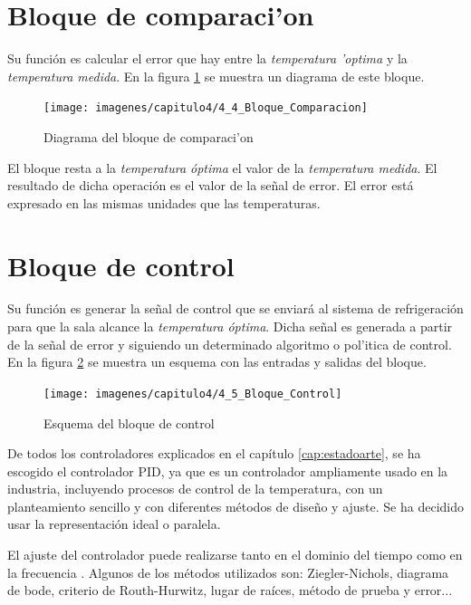 \section{Bloque de comparaci'on}\label{sec:comparacion}

Su función es calcular el error que hay entre la \textit{temperatura 'optima} y la \textit{temperatura medida}. En la figura \ref{4_4:diag_comparacion} se muestra un diagrama de este bloque. 

\begin{figure}[htbp]
  \centering
  \texttt{[image: imagenes/capitulo4/4\_4\_Bloque\_Comparacion]}
   \caption{Diagrama del bloque de comparaci'on}
   \label{4_4:diag_comparacion}
\end{figure}

	El bloque resta a la \textit{temperatura óptima} el valor de la \textit{temperatura medida}. El resultado de dicha operación es el valor de la señal de error. El error está expresado en las mismas unidades que las temperaturas.

\section{Bloque de control}\label{sec:control}

	Su función es generar la señal de control que se enviará al sistema de refrigeración para que la sala alcance la \textit{temperatura óptima}. Dicha señal es generada a partir de la señal de error y siguiendo un determinado algoritmo o pol'itica de control. En la figura \ref{4_5:diag_control} se muestra un esquema con las entradas y salidas del bloque.

\begin{figure}[htbp]
  \centering
  \texttt{[image: imagenes/capitulo4/4\_5\_Bloque\_Control]}
   \caption{Esquema del bloque de control}
   \label{4_5:diag_control}
\end{figure}

	De todos los controladores explicados en el capítulo \ref{cap:estadoarte}, se ha escogido el controlador PID, ya que es un controlador ampliamente usado en la industria, incluyendo procesos de control de la temperatura, con un planteamiento sencillo y con diferentes métodos de diseño y ajuste. Se ha decidido usar la representación ideal o paralela.

	El ajuste del controlador puede realizarse tanto en el dominio del tiempo como en la frecuencia \cite{PID}. Algunos de los métodos utilizados son: Ziegler-Nichols, diagrama de bode, criterio de Routh-Hurwitz, lugar de raíces, método de prueba y error... 

